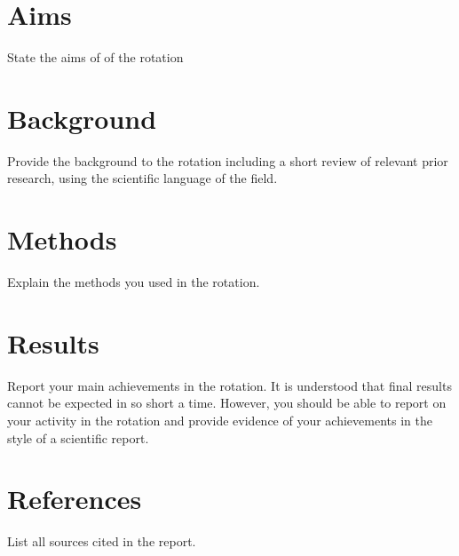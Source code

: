\documentclass[paper=a4wide, fontsize=12pt]{scrartcl}	 %
\begin{document}
\section*{Aims}

State the aims of of the rotation

\section*{Background}

Provide the background to the rotation including a short review of relevant prior research, using the scientific language of the field.

\section*{Methods}

Explain the methods you used in the rotation.


\section*{Results}

Report your main achievements in the rotation. It is understood that final results cannot be expected in so short a time. However, you should be able to report on your activity in the rotation and provide evidence of your achievements in the style of a scientific report.


\section*{References}

List all sources cited in the report.
\end{document}
